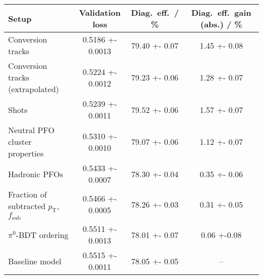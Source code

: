 \begin{tabular}{p{5cm}S[table-format=1.4(4)]S[table-format=2.2(2)]S[table-format=1.2(2)]}
  \toprule
  {Setup} & {Validation loss} & {Diag.\ eff.\ / \si{\percent}} & {Diag.\ eff.\ gain (abs.) / \si{\percent}} \\
  \midrule
  Conversion tracks & 0.5186 +- 0.0013 & 79.40 +- 0.07 & 1.45 +- 0.08 \\
  Conversion tracks (extrapolated) & 0.5224 +- 0.0012 & 79.23 +- 0.06 & 1.28 +- 0.07 \\
  Shots & 0.5239 +- 0.0011 & 79.52 +- 0.06 &  1.57 +- 0.07 \\
  Neutral PFO cluster properties & 0.5310 +- 0.0010 & 79.07 +- 0.06 & 1.12 +- 0.07 \\
  Hadronic PFOs & 0.5433 +- 0.0007 & 78.30 +- 0.04 & 0.35 +- 0.06 \\
  Fraction of subtracted $p_\text{T}$, $f_\text{sub}$ & 0.5466 +- 0.0005 & 78.26 +- 0.03 & 0.31 +- 0.05 \\
  $\pi^0$-BDT ordering & 0.5511 +- 0.0013 & 78.01 +- 0.07 & 0.06 +-0.08 \\
  Baseline model & 0.5515 +- 0.0011 & 78.05 +- 0.05 & {--} \\
  \bottomrule
\end{tabular}

